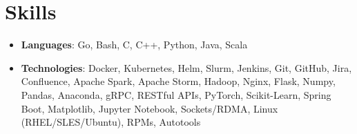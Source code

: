 \documentclass[letterpaper,11pt]{article}
\newcommand{\resumeSubHeadingListStart}{\begin{itemize}[leftmargin=*]}
\newcommand{\resumeSubHeadingListEnd}{\end{itemize}}
\begin{document}
\section{Skills}
  \resumeSubHeadingListStart
    \item{
      \textbf{Languages}{: Go, Bash, C, C++, Python, Java, Scala}
    }
    \item{
      \textbf{Technologies}{: Docker, Kubernetes, Helm, Slurm, Jenkins, Git, GitHub, Jira, Confluence, Apache Spark,
Apache Storm, Hadoop, Nginx, Flask, Numpy, Pandas, Anaconda, gRPC, RESTful APIs, PyTorch, Scikit-Learn, Spring Boot,
Matplotlib, Jupyter Notebook, Sockets/RDMA, Linux (RHEL/SLES/Ubuntu), RPMs, Autotools}
    }
 \resumeSubHeadingListEnd


\end{document}
